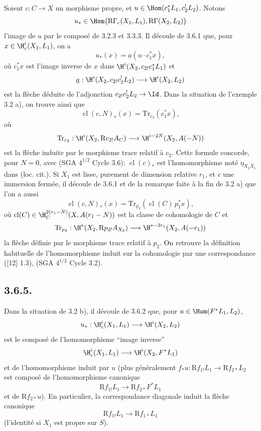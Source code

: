 Soient $c:C\to X$ un morphisme propre, et $u\in\Hom(c_1^*L_1,c_2^!L_2)$. Notons
\[
u_*\in\Hom\bigl(\mathrm{R}\Gamma_c(X_1,L_1),\mathrm{R}\Gamma(X_2,L_2)\bigr)
\]
l'image de $u$ par le composé de 3.2.3 et 3.3.3. Il découle de 3.6.1 que, pour $x\in\H_c^i(X_1,L_1)$, on a
\begin{equation}
u_*(x)=\underline{a}(u\cdot c_1^*x),
\tag{3.6.2}
\end{equation}
où $c_1^*x$ est l'image inverse de $x$ dans $\H^i(X_2,c_{2!}c_1^*L_1)$ et
\[
\underline{a}:\H^i(X_2,c_{2!}c_2^!L_2)\longrightarrow \H^i(X_2,L_2)
\]
est la flèche déduite de l'adjonction $c_{2!}c_2^!L_2\to\Id$. Dans la situation de l'exemple 3.2 a), on trouve ainsi que
\begin{equation}
\operatorname{cl}(c,N)_*(x)=\mathrm{Tr}_{c_2}(c_1^*x),
\tag{3.6.3}
\end{equation}
où
\[
\mathrm{Tr}_{c_2}:\H^i(X_2,\mathrm{R} c_{2!}A_C)\longrightarrow\H^{i-2N}(X_2,A(-N))
\]
est la flèche
induite par le morphisme trace relatif à $c_2$. Cette formule concorde, pour $N=0$, avec (SGA $4^{1/2}$ Cycle 3.6): $\operatorname{cl}(c)_*$ est l'homomorphisme noté $\eta_{X_2X_1}$ dans (loc. cit.). Si $X_1$ est lisse, purement de dimension relative $r_1$, et $c$ une immersion fermée, il découle de 3.6.1 et de la remarque faite à la fin de 3.2 a) que l'on a aussi
\begin{equation}
\operatorname{cl}(c,N)_*(x)=\mathrm{Tr}_{p_2}(\operatorname{cl}(C)\,p_1^*x),
\tag{3.6.4}
\end{equation}
où $\operatorname{cl}(C)\in \H_C^{2(r_1-N)}(X,A(r_1-N))$ est la classe de cohomologie de $C$ et
\[
\mathrm{Tr}_{p_2}:\H^*(X_2,\mathrm{R} p_{2!}A_{X_2})\longrightarrow \H^{*-2r_1}(X_2,A(-r_1))
\]
la flèche définie par le morphisme trace relatif à $p_2$. On retrouve la définition habituelle de l'homomorphisme induit sur la cohomologie par une correspondance ([12] 1.3), (SGA $4^{1/2}$ Cycle 3.2).

\subsection*{3.6.5.}
Dans la situation de 3.2 b), il découle de 3.6.2 que, pour $u\in\Hom(F^*L_1,L_2)$,
\[
u_*:\H_c^i(X_1,L_1)\longrightarrow \H^i(X_2,L_2)
\]
est le composé de l'homomorphisme ``image inverse''
\[
\H_c^i(X_1,L_1)\longrightarrow \H^i(X_2,F^*L_1)
\]
et de l'homomorphisme induit par $u$ (plus généralement $f_*u:\mathrm{R} f_{1!}L_1\to \mathrm{R} f_{2*}L_2$ est composé de l'homomorphisme canonique
\[
\mathrm{R} f_{1!}L_1\longrightarrow \mathrm{R} f_{2*}F^*L_1
\]
et de $\mathrm{R} f_{2*}u$). En particulier, la correspondance diagonale induit la flèche canonique
\[
\mathrm{R} f_{1!}L_1\longrightarrow \mathrm{R} f_{1*}L_1
\]
(l'identité si $X_1$ est propre sur $S$).

